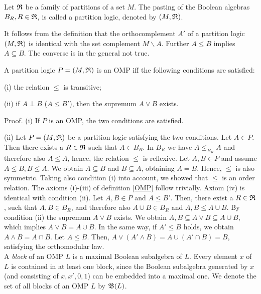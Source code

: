 \begin{defin}
Let ${\frak R}$ be a family of partitions of a set $M$.
The pasting of the Boolean algebras $B_R,R \in {\frak R}$, is called
a partition logic, denoted by $(M,{\frak R})$.
\end{defin}

It follows from the definition that the orthocomplement $A'$ of
a partition logic $(M,{\frak R})$ is identical with the set complement
$M \backslash A$.
Further $A \le B$ implies $A \subseteq B$.
The converse is in the general not true.

\begin{lemma}
A partition logic $P=(M,{\frak R})$ is an OMP iff the following conditions
are satisfied:

(i) the relation $\le$ is transitive;

(ii) if $A \perp B$ ($A \le B'$), then the supremum $A \vee B$ exists.
\end{lemma}

Proof.
(i) If $P$ is an OMP, the two conditions are satisfied.

(ii) Let $P=(M,{\frak R})$ be a partition logic satisfying the two conditions.
Let $A \in P$. Then there exists  a $R \in {\frak R}$ such that $A \in
B_R$.
In $B_R$ we have $A \le_{B_R} A$ and therefore also $A \le A$, hence,
the relation $\le$ is reflexive.
Let $A,B \in P$ and assume $A \le B,B \le A$.
We obtain $A \subseteq B$ and $B \subseteq A$, obtaining $A = B$.
Hence, $\le$ is also symmetric.
Taking also condition (i) into account, we showed that $\le$
is an order relation.
The axioms (i)-(iii) of definition \ref{OMP} follow trivially.
Axiom (iv) is identical with condition (ii).
Let $A,B \in P$ and $A \le B'$.
Then, there exist a $R \in {\frak R}$, such that
$A,B \in B_R$, and therefore also $A \cup B \in B_R$ and $A,B \le A \cup B$.
By condition (ii) the supremum $A \vee B$ exists.
We obtain $A,B \subseteq A \vee B \subseteq A \cup B$, which implies
$A \vee B = A \cup B$.
In the same way, if $A' \le B$ holds, we obtain
$A \wedge B = A \cap B$.
Let $A \le B$.
Then, $A \vee (A' \wedge B) = A \cup (A' \cap B) = B$, satisfying
the orthomodular law. \\

A {\em block} of an OMP $L$ is a maximal Boolean subalgebra of $L$.
Every element $x$ of $L$ is contained in at least one block,
since the Boolean subalgebra generated by $x$ (and consisting of
$x,x',0,1$) can be embedded into a maximal one.
We denote the set of all blocks of an OMP $L$ by ${\frak B}(L)$.\\

